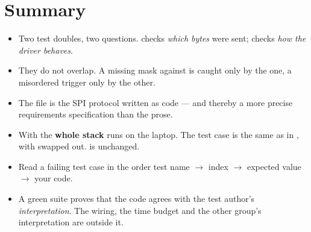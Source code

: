 \section*{Summary}

\begin{itemize}
  \item Two test doubles, two questions.  checks \emph{which bytes} were
    sent;  checks \emph{how the driver behaves}.
  \item They do not overlap. A missing mask against  is caught only by the one, a
    misordered trigger only by the other.
  \item The  file is the SPI protocol written as code --- and thereby a
    more precise requirements specification than the prose.
  \item With  the \textbf{whole stack} runs on the laptop. The test case is
    the same as in , with  swapped out.  is
    unchanged.
  \item Read a failing test case in the order test name $\rightarrow$ index $\rightarrow$ expected
    value $\rightarrow$ your code.
  \item A green suite proves that the code agrees with the test author's \emph{interpretation}.
    The wiring, the time budget and the other group's interpretation are outside it.
\end{itemize}
